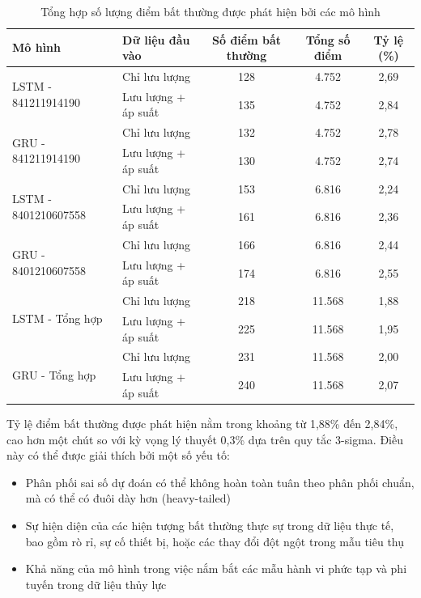 \begin{table}[htbp]
    \centering
    \begin{tabular}{|l|l|c|c|c|}
        \hline
        \textbf{Mô hình} & \textbf{Dữ liệu đầu vào} & \textbf{Số điểm bất thường} & \textbf{Tổng số điểm} & \textbf{Tỷ lệ (\%)} \\
        \hline
        \multirow{2}{*}{LSTM - 841211914190} & Chỉ lưu lượng & 128 & 4.752 & 2,69 \\
        \cline{2-5}
        & Lưu lượng + áp suất & 135 & 4.752 & 2,84 \\
        \hline
        \multirow{2}{*}{GRU - 841211914190} & Chỉ lưu lượng & 132 & 4.752 & 2,78 \\
        \cline{2-5}
        & Lưu lượng + áp suất & 130 & 4.752 & 2,74 \\
        \hline
        \multirow{2}{*}{LSTM - 8401210607558} & Chỉ lưu lượng & 153 & 6.816 & 2,24 \\
        \cline{2-5}
        & Lưu lượng + áp suất & 161 & 6.816 & 2,36 \\
        \hline
        \multirow{2}{*}{GRU - 8401210607558} & Chỉ lưu lượng & 166 & 6.816 & 2,44 \\
        \cline{2-5}
        & Lưu lượng + áp suất & 174 & 6.816 & 2,55 \\
        \hline
        \multirow{2}{*}{LSTM - Tổng hợp} & Chỉ lưu lượng & 218 & 11.568 & 1,88 \\
        \cline{2-5}
        & Lưu lượng + áp suất & 225 & 11.568 & 1,95 \\
        \hline
        \multirow{2}{*}{GRU - Tổng hợp} & Chỉ lưu lượng & 231 & 11.568 & 2,00 \\
        \cline{2-5}
        & Lưu lượng + áp suất & 240 & 11.568 & 2,07 \\
        \hline
    \end{tabular}
    \caption{Tổng hợp số lượng điểm bất thường được phát hiện bởi các mô hình}
    \label{tab:anomaly_detection_summary}
\end{table}

Tỷ lệ điểm bất thường được phát hiện nằm trong khoảng từ 1,88\% đến 2,84\%, cao hơn một chút so với kỳ vọng lý thuyết 0,3\% dựa trên quy tắc 3-sigma. Điều này có thể được giải thích bởi một số yếu tố:

\begin{itemize}
    \item Phân phối sai số dự đoán có thể không hoàn toàn tuân theo phân phối chuẩn, mà có thể có đuôi dày hơn (heavy-tailed)
    \item Sự hiện diện của các hiện tượng bất thường thực sự trong dữ liệu thực tế, bao gồm rò rỉ, sự cố thiết bị, hoặc các thay đổi đột ngột trong mẫu tiêu thụ
    \item Khả năng của mô hình trong việc nắm bắt các mẫu hành vi phức tạp và phi tuyến trong dữ liệu thủy lực
\end{itemize}

